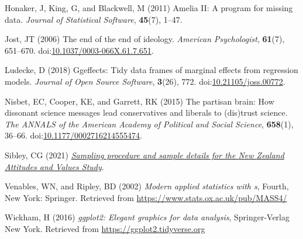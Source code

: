 \documentclass[
  single column]{article}
\newlength{\cslhangindent}
\newenvironment{CSLReferences}[2] %
 {\begin{list}{}{%
  \setlength{\itemindent}{0pt}
  \setlength{\leftmargin}{0pt}
  \setlength{\parsep}{0pt}
  \ifodd #1
   \setlength{\leftmargin}{\cslhangindent}
   \setlength{\itemindent}{-1\cslhangindent}
  \fi
  \setlength{\itemsep}{#2\baselineskip}}}
 {\end{list}}
\begin{document}
\begin{CSLReferences}{1}{0}
Honaker, J, King, G, and Blackwell, M (2011) {Amelia II}: A program for
missing data. \emph{Journal of Statistical Software}, \textbf{45}(7),
1--47.

Jost, JT (2006) The end of the end of ideology. \emph{American
Psychologist}, \textbf{61}(7), 651--670.
doi:\href{https://doi.org/10.1037/0003-066X.61.7.651}{10.1037/0003-066X.61.7.651}.

Ludecke, D (2018) Ggeffects: Tidy data frames of marginal effects from
regression models. \emph{Journal of Open Source Software},
\textbf{3}(26), 772.
doi:\href{https://doi.org/10.21105/joss.00772}{10.21105/joss.00772}.

Nisbet, EC, Cooper, KE, and Garrett, RK (2015) The partisan brain: How
dissonant science messages lead conservatives and liberals to (dis)trust
science. \emph{The ANNALS of the American Academy of Political and
Social Science}, \textbf{658}(1), 36--66.
doi:\href{https://doi.org/10.1177/0002716214555474}{10.1177/0002716214555474}.

Sibley, CG (2021)
\emph{\href{https://doi.org/10.31234/osf.io/wgqvy}{Sampling procedure
and sample details for the {N}ew {Z}ealand {A}ttitudes and {V}alues
{S}tudy}}.

Venables, WN, and Ripley, BD (2002) \emph{Modern applied statistics with
s}, Fourth, New York: Springer. Retrieved from
\url{https://www.stats.ox.ac.uk/pub/MASS4/}

Wickham, H (2016) \emph{ggplot2: Elegant graphics for data analysis},
Springer-Verlag New York. Retrieved from
\url{https://ggplot2.tidyverse.org}

\end{CSLReferences}
\end{document}
